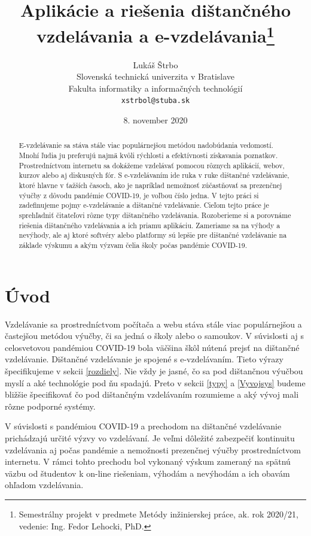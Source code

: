 \documentclass[10pt,oneside,slovak,a4paper]{article}
\title{Aplikácie a riešenia dištančného vzdelávania a e-vzdelávania\thanks{Semestrálny projekt v predmete Metódy inžinierskej práce, ak. rok 2020/21, vedenie: Ing. Fedor Lehocki, PhD.}}
\author{Lukáš Štrbo\\[2pt]
	{\small Slovenská technická univerzita v Bratislave}\\
	{\small Fakulta informatiky a informačných technológií}\\
	{\small \texttt{xstrbol@stuba.sk}}
	}
\date{\small 8. november 2020}
\begin{document}
\maketitle

\begin{abstract}
E-vzdelávanie sa stáva stále viac populárnejšou metódou nadobúdania vedomostí. Mnohí ľudia ju preferujú najmä kvôli rýchlosti a efektívnosti získavania poznatkov.
Prostredníctvom internetu sa dokážeme vzdelávať pomocou rôznych aplikácií, webov, kurzov alebo aj diskusných fór.
S e-vzdelávaním ide ruka v ruke dištančné vzdelávanie, ktoré hlavne v ťažších časoch, ako je napríklad nemožnosť zúčastňovať sa prezenčnej výučby z dôvodu pandémie COVID-19, 
 je voľbou číslo jedna. V tejto práci si zadefinujeme pojmy e-vzdelávanie a dištančné vzdelávanie. Cieľom tejto práce je sprehľadniť čitateľovi rôzne typy dištančného vzdelávania. Rozoberieme si a porovnáme riešenia dištančného vzdelávania a ich priamu
 aplikáciu. Zameriame sa na výhody a nevýhody, ale aj ktoré softvéry alebo platformy sú lepšie pre dištančné vzdelávanie na základe výskumu a akým výzvam čelia školy počas pandémie COVID-19.
\end{abstract}



\section*{Úvod} %
\label{uvod}
Vzdelávanie sa prostredníctvom počítača a webu stáva stále viac populárnejšou a častejšou metódou výučby, či sa jedná o školy alebo o samoukov. V súvislosti aj s celosvetovou pandémiou 
 COVID-19 bola väčšina škôl nútená prejsť na dištančné vzdelávanie. Dištančné vzdelávanie je spojené s e-vzdelávaním. Tieto výrazy špecifikujeme v sekcii \ref{rozdiely}.  
 Nie vždy je jasné, čo sa pod dištančnou výučbou myslí a aké technológie pod ňu spadajú. Preto v sekcii \ref{typy} a \ref{Vyvojsys} budeme bližšie špecifikovať čo pod dištančným vzdelávaním rozumieme a aký vývoj mali rôzne podporné systémy.
 
 V súvislosti s pandémiou COVID-19 a prechodom na dištančné vzdelávanie prichádzajú určité výzvy vo vzdelávaní.
 Je veľmi dôležité zabezpečiť kontinuitu vzdelávania aj počas pandémie a nemožnosti prezenčnej výučby prostredníctvom internetu. V rámci tohto prechodu bol vykonaný výskum zameraný na spätnú väzbu od študentov k on-line riešeniam, výhodám a nevýhodám a ich obavám ohľadom vzdelávania.
\end{document}
